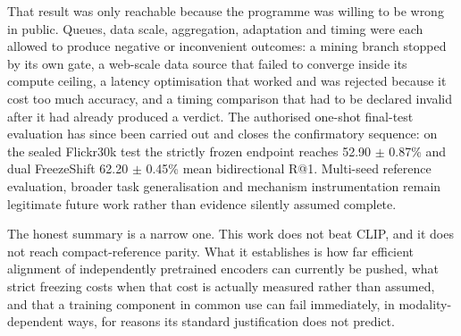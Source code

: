 \documentclass[11pt,a4paper,oneside]{report}
\begin{document}
That result was only reachable because the programme was willing to be wrong in public. Queues, data scale, aggregation, adaptation and timing were each allowed to produce negative or inconvenient outcomes: a mining branch stopped by its own gate, a web-scale data source that failed to converge inside its compute ceiling, a latency optimisation that worked and was rejected because it cost too much accuracy, and a timing comparison that had to be declared invalid after it had already produced a verdict. The authorised one-shot final-test evaluation has since been carried out and closes the confirmatory sequence: on the sealed Flickr30k test the strictly frozen endpoint reaches 52.90 $\pm$ 0.87\% and dual FreezeShift 62.20 $\pm$ 0.45\% mean bidirectional R@1. Multi-seed reference evaluation, broader task generalisation and mechanism instrumentation remain legitimate future work rather than evidence silently assumed complete.

The honest summary is a narrow one. This work does not beat CLIP, and it does not reach compact-reference parity. What it establishes is how far efficient alignment of independently pretrained encoders can currently be pushed, what strict freezing costs when that cost is actually measured rather than assumed, and that a training component in common use can fail immediately, in modality-dependent ways, for reasons its standard justification does not predict.
\end{document}
